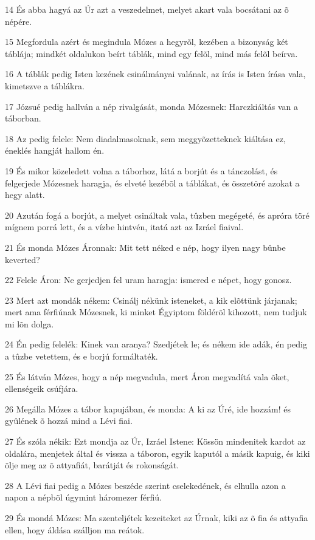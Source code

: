 \par 14 És abba hagyá az Úr azt a veszedelmet, melyet akart vala bocsátani az õ népére.
\par 15 Megfordula azért és megindula Mózes a hegyrõl, kezében a bizonyság két táblája; mindkét oldalukon beírt táblák, mind egy felõl, mind más felõl beírva.
\par 16 A táblák pedig Isten kezének csinálmányai valának, az írás is Isten írása vala, kimetszve a táblákra.
\par 17 Józsué pedig hallván a nép rivalgását, monda Mózesnek: Harczkiáltás van a táborban.
\par 18 Az pedig felele: Nem diadalmasoknak, sem meggyõzetteknek kiáltása ez, éneklés hangját hallom én.
\par 19 És mikor közeledett volna a táborhoz, látá a borjút és a tánczolást, és felgerjede Mózesnek haragja, és elveté kezébõl a táblákat, és összetöré azokat a hegy alatt.
\par 20 Azután fogá a borjút, a melyet csináltak vala, tûzben megégeté, és apróra töré mígnem porrá lett, és a vízbe hintvén, itatá azt az Izráel fiaival.
\par 21 És monda Mózes Áronnak: Mit tett néked e nép, hogy ilyen nagy bûnbe keverted?
\par 22 Felele Áron: Ne gerjedjen fel uram haragja: ismered e népet, hogy gonosz.
\par 23 Mert azt mondák nékem: Csinálj nékünk isteneket, a kik elõttünk járjanak; mert ama férfiúnak Mózesnek, ki minket Égyiptom földérõl kihozott, nem tudjuk mi lõn dolga.
\par 24 Én pedig felelék: Kinek van aranya? Szedjétek le; és nékem ide adák, én pedig a tûzbe vetettem, és e borjú formáltaték.
\par 25 És látván Mózes, hogy a nép megvadula, mert Áron megvadítá vala õket, ellenségeik csúfjára.
\par 26 Megálla Mózes a tábor kapujában, és monda: A ki az Úré, ide hozzám! és gyûlének õ hozzá mind a Lévi fiai.
\par 27 És szóla nékik: Ezt mondja az Úr, Izráel Istene: Kössön mindenitek kardot az oldalára, menjetek által és vissza a táboron, egyik kaputól a másik kapuig, és kiki ölje meg az õ attyafiát, barátját és rokonságát.
\par 28 A Lévi fiai pedig a Mózes beszéde szerint cselekedének, és elhulla azon a napon a népbõl úgymint háromezer férfiú.
\par 29 És mondá Mózes: Ma szenteljétek kezeiteket az Úrnak, kiki az õ fia és attyafia ellen, hogy áldása szálljon ma reátok.
